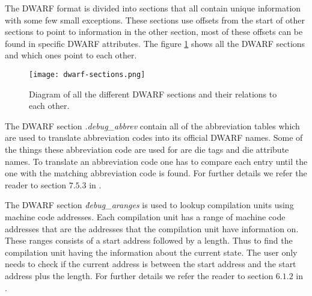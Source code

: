  


The \gls{DWARF} format is divided into sections that all contain unique information with some few small exceptions.
These sections use offsets from the start of other sections to point to information in the other section, most of these offsets can be found in specific \gls{DWARF} attributes.
The figure \ref{fig:dwarfsections} shows all the \gls{DWARF} sections and which ones point to each other.




\begin{figure}[h]
	\centering
	\texttt{[image: dwarf-sections.png]}
	\caption{Diagram of all the different \gls{DWARF} sections and their relations to each other.}
	\label{fig:dwarfsections}
\end{figure}


The \gls{DWARF} section \emph{.debug\_abbrev} contain all of the abbreviation tables which are used to translate abbreviation codes into its official \gls{DWARF} names.
Some of the things these abbreviation code are used for are \gls{die} tags and \gls{die} attribute names.
To translate an abbreviation code one has to compare each entry until the one with the matching abbreviation code is found.
For further details we refer the reader to section $7.5.3$ in \cite{dwarf}.


The \gls{DWARF} section \emph{\.debug\_aranges} is used to lookup compilation units using machine code addresses.
Each compilation unit has a range of machine code addresses that are the addresses that the compilation unit have information on.
These ranges consists of a start address followed by a length.
Thus to find the compilation unit having the information about the current state.
The user only needs to check if the current address is between the start address and the start address plus the length.
For further details we refer the reader to section $6.1.2$ in \cite{dwarf}.


